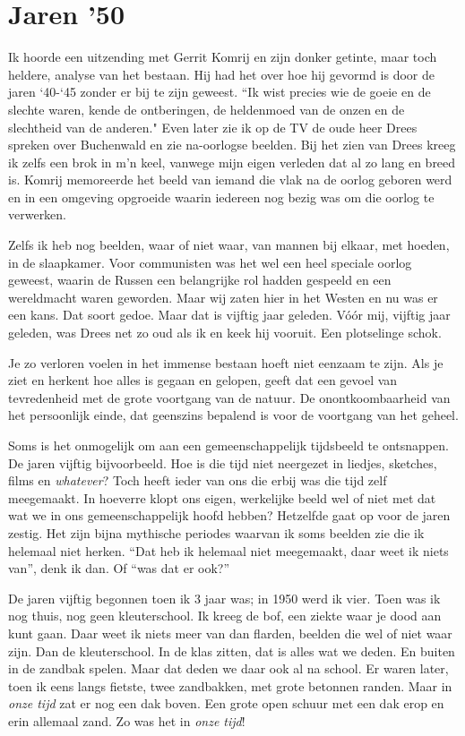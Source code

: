 \documentclass[12pt,twoside]{memoir}
\begin{document}
\chapter{Jaren '50} %
\label{cha:jaren50}

Ik hoorde een uitzending met Gerrit Komrij en zijn donker getinte, maar toch heldere, analyse van het bestaan. Hij had het over hoe hij gevormd is door de jaren `40-`45 zonder er bij te zijn geweest. ``Ik wist precies wie de goeie en de slechte waren, kende de ontberingen, de heldenmoed van de onzen en de slechtheid van de anderen." Even later zie ik op de TV de oude heer Drees spreken over Buchenwald en zie na-oorlogse beelden. Bij het zien van Drees kreeg ik zelfs een brok in m’n keel, vanwege mijn eigen verleden dat al zo lang en breed is. Komrij memoreerde het beeld van iemand die vlak na de oorlog geboren werd en in een omgeving opgroeide waarin iedereen nog bezig was om die oorlog te verwerken. 

Zelfs ik heb nog beelden, waar of niet waar, van mannen bij elkaar, met hoeden, in de slaapkamer. Voor communisten was het wel een heel speciale oorlog geweest, waarin de Russen een belangrijke rol hadden gespeeld en een wereldmacht waren geworden. Maar wij zaten hier in het Westen en nu was er een kans. Dat soort gedoe. Maar dat is vijftig jaar geleden. Vóór mij, vijftig jaar geleden, was Drees net zo oud als ik en keek hij vooruit. Een plotselinge schok.

Je zo verloren voelen in het immense bestaan hoeft niet eenzaam te zijn. Als je ziet en herkent hoe alles is gegaan en gelopen, geeft dat een gevoel van tevredenheid met de grote voortgang van de natuur. De onontkoombaarheid van het persoonlijk einde, dat geenszins bepalend is voor de voortgang van het geheel.

Soms is het onmogelijk om aan een gemeenschappelijk tijdsbeeld te ontsnappen. De jaren vijftig bijvoorbeeld. Hoe is die tijd niet neergezet in liedjes, sketches, films en \emph{whatever}? Toch heeft ieder van ons die erbij was die tijd zelf meegemaakt. In hoeverre klopt ons eigen, werkelijke beeld wel of niet met dat wat we in ons gemeenschappelijk hoofd hebben? Hetzelfde gaat op voor de jaren zestig. Het zijn bijna mythische periodes waarvan ik soms beelden zie die ik helemaal niet herken. ``Dat heb ik helemaal niet meegemaakt, daar weet ik niets van'', denk ik dan. Of ``was dat er ook?''

De jaren vijftig begonnen toen ik 3 jaar was; in 1950 werd ik vier. Toen was ik nog thuis, nog geen kleuterschool. Ik kreeg de bof, een ziekte waar je dood aan kunt gaan. Daar weet ik niets meer van dan flarden, beelden die wel of niet waar zijn. Dan de kleuterschool. In de klas zitten, dat is alles wat we deden. En buiten in de zandbak spelen. Maar dat deden we daar ook al na school. Er waren later, toen ik eens langs fietste, twee zandbakken, met grote betonnen randen. Maar in \emph{onze tijd} zat er nog een dak boven. Een grote open schuur met een dak erop en erin allemaal zand. Zo was het in \emph{onze tijd}!
\end{document}
